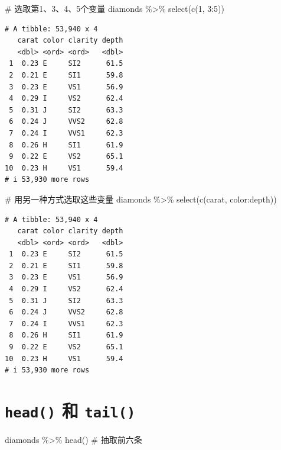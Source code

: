 \documentclass[
  letterpaper,
]{ctexbook}
\newenvironment{Shaded}{\begin{snugshade}}{\end{snugshade}}
\newcommand{\CommentTok}[1]{\textcolor[rgb]{0.37,0.37,0.37}{#1}}
\newcommand{\DecValTok}[1]{\textcolor[rgb]{0.68,0.00,0.00}{#1}}
\newcommand{\FunctionTok}[1]{\textcolor[rgb]{0.28,0.35,0.67}{#1}}
\newcommand{\NormalTok}[1]{\textcolor[rgb]{0.00,0.23,0.31}{#1}}
\newcommand{\SpecialCharTok}[1]{\textcolor[rgb]{0.37,0.37,0.37}{#1}}
\begin{document}
\begin{Shaded}
\begin{Highlighting}[]
\CommentTok{\# 选取第1、3、4、5个变量}
\NormalTok{diamonds }\SpecialCharTok{\%\textgreater{}\%}
  \FunctionTok{select}\NormalTok{(}\FunctionTok{c}\NormalTok{(}\DecValTok{1}\NormalTok{, }\DecValTok{3}\SpecialCharTok{:}\DecValTok{5}\NormalTok{))}
\end{Highlighting}
\end{Shaded}

\begin{verbatim}
# A tibble: 53,940 x 4
   carat color clarity depth
   <dbl> <ord> <ord>   <dbl>
 1  0.23 E     SI2      61.5
 2  0.21 E     SI1      59.8
 3  0.23 E     VS1      56.9
 4  0.29 I     VS2      62.4
 5  0.31 J     SI2      63.3
 6  0.24 J     VVS2     62.8
 7  0.24 I     VVS1     62.3
 8  0.26 H     SI1      61.9
 9  0.22 E     VS2      65.1
10  0.23 H     VS1      59.4
# i 53,930 more rows
\end{verbatim}

\begin{Shaded}
\begin{Highlighting}[]
\CommentTok{\# 用另一种方式选取这些变量}
\NormalTok{diamonds }\SpecialCharTok{\%\textgreater{}\%}
  \FunctionTok{select}\NormalTok{(}\FunctionTok{c}\NormalTok{(carat, color}\SpecialCharTok{:}\NormalTok{depth))}
\end{Highlighting}
\end{Shaded}

\begin{verbatim}
# A tibble: 53,940 x 4
   carat color clarity depth
   <dbl> <ord> <ord>   <dbl>
 1  0.23 E     SI2      61.5
 2  0.21 E     SI1      59.8
 3  0.23 E     VS1      56.9
 4  0.29 I     VS2      62.4
 5  0.31 J     SI2      63.3
 6  0.24 J     VVS2     62.8
 7  0.24 I     VVS1     62.3
 8  0.26 H     SI1      61.9
 9  0.22 E     VS2      65.1
10  0.23 H     VS1      59.4
# i 53,930 more rows
\end{verbatim}

\hypertarget{head-ux548c-tail}{%
\section{\texorpdfstring{\texttt{head()} 和
\texttt{tail()}}{head() 和 tail()}}\label{head-ux548c-tail}}

\begin{Shaded}
\begin{Highlighting}[]
\NormalTok{diamonds }\SpecialCharTok{\%\textgreater{}\%}
  \FunctionTok{head}\NormalTok{() }\CommentTok{\# 抽取前六条}
\end{Highlighting}
\end{Shaded}
\end{document}
